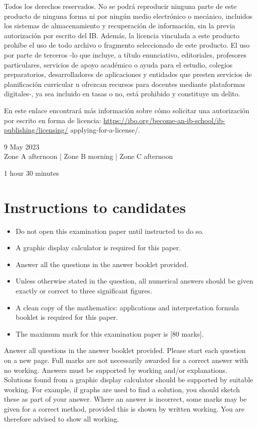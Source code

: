 \documentclass[10pt]{article}
\begin{document}
Todos los derechos reservados. No se podrá reproducir ninguna parte de este producto de ninguna forma ni por ningún medio electrónico o mecánico, incluidos los sistemas de almacenamiento y recuperación de información, sin la previa autorización por escrito del IB. Además, la licencia vinculada a este producto prohíbe el uso de todo archivo o fragmento seleccionado de este producto. El uso por parte de terceros -lo que incluye, a título enunciativo, editoriales, profesores particulares, servicios de apoyo académico o ayuda para el estudio, colegios preparatorios, desarrolladores de aplicaciones y entidades que presten servicios de planificación curricular u ofrezcan recursos para docentes mediante plataformas digitales-, ya sea incluido en tasas o no, está prohibido y constituye un delito.

En este enlace encontrará más información sobre cómo solicitar una autorización por escrito en forma de licencia: \href{https://ibo.org/become-an-ib-school/ib-publishing/licensing/}{https://ibo.org/become-an-ib-school/ib-publishing/licensing/} applying-for-a-license/.

9 May 2023\\
Zone A afternoon | Zone B morning | Zone C afternoon

1 hour 30 minutes

\section*{Instructions to candidates}
\begin{itemize}
  \item Do not open this examination paper until instructed to do so.
  \item A graphic display calculator is required for this paper.
  \item Answer all the questions in the answer booklet provided.
  \item Unless otherwise stated in the question, all numerical answers should be given exactly or correct to three significant figures.
  \item A clean copy of the mathematics: applications and interpretation formula booklet is required for this paper.
  \item The maximum mark for this examination paper is [80 marks].
\end{itemize}

Answer all questions in the answer booklet provided. Please start each question on a new page. Full marks are not necessarily awarded for a correct answer with no working. Answers must be supported by working and/or explanations. Solutions found from a graphic display calculator should be supported by suitable working. For example, if graphs are used to find a solution, you should sketch these as part of your answer. Where an answer is incorrect, some marks may be given for a correct method, provided this is shown by written working. You are therefore advised to show all working.
\end{document}

